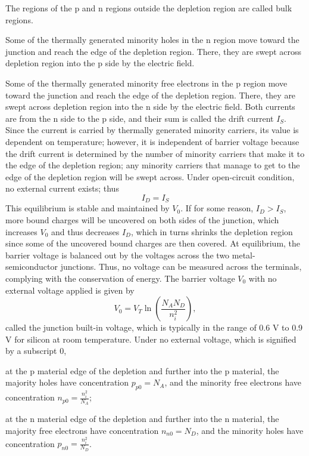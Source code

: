 \documentclass[a4paper,12pt]{report}
\begin{document}
The regions of the p and n regions outside the depletion region are called bulk regions.
\bit
\item Some of the thermally generated minority holes in the n region move toward the junction and reach the edge of the depletion region. There, they are swept across depletion region into the p side by the electric field.
\item Some of the thermally generated minority free electrons in the p region move toward the junction and reach the edge of the depletion region. There, they are swept across depletion region into the n side by the electric field.
\eit
Both currents are from the n side to the p side, and their sum is called the drift current $I_S$. Since the current is carried by thermally generated minority carriers, its value is dependent on temperature; however, it is independent of barrier voltage because the drift current is determined by the number of minority carriers that make it to the edge of the depletion region; any minority carriers that manage to get to the edge of the depletion region will be swept across.
Under open-circuit condition, no external current exists; thus
\[I_D=I_S\]
This equilibrium is stable and maintained by $V_0$. If for some reason, $I_D>I_S$, more bound charges will be uncovered on both sides of the junction, which increases $V_0$ and thus decreases $I_D$, which in turns shrinks the depletion region since some of the uncovered bound charges are then covered.
At equilibrium, the barrier voltage is balanced out by the voltages across the two metal-semiconductor junctions. Thus, no voltage can be measured across the terminals, complying with the conservation of energy.
The barrier voltage $V_0$ with no external voltage applied is given by
\[V_0=V_T\ln(\frac{N_AN_D}{n_i^2}),\]
called the junction built-in voltage, which is typically in the range of 0.6 V to 0.9 V for silicon at room temperature.
Under no external voltage, which is signified by a subscript $0$,
\bit
\item at the p material edge of the depletion and further into the p material, the majority holes have concentration $p_{p0}=N_A$, and the minority free electrons have concentration $n_{p0}=\frac{n_i^2}{N_A}$;
\item at the n material edge of the depletion and further into the n material, the majority free electrons have concentration $n_{n0}=N_D$, and the minority holes have concentration $p_{n0}=\frac{n_i^2}{N_D}$.
\end{document}
